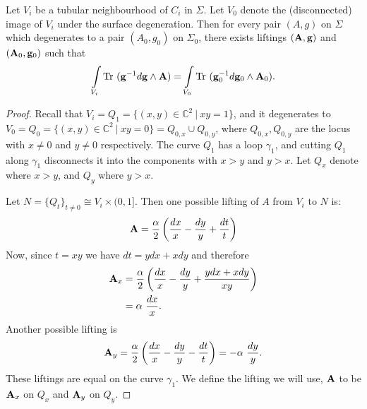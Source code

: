 	\begin{lemma}
		Let $V_i$ be a tubular neighbourhood of $C_i$ in $\Sigma$. Let $V_{0}$ denote the (disconnected) image of $V_i$ under the surface degeneration. Then for every pair $(A,g)$ on $\Sigma$ which degenerates to a pair $(A_0, g_0)$ on $\Sigma_0$, there exists liftings $(\mathbf{A},\mathbf{g})$ and $(\mathbf{A}_0,\mathbf{g}_0)$ such that
		\begin{equation}
			\int\limits_{V_i} \text{Tr }(\mathbf{g}^{-1}d\mathbf{g}\wedge \mathbf{A}) = \int\limits_{V_0} \text{Tr }(\mathbf{g}_0^{-1}d\mathbf{g}_0\wedge \mathbf{A}_0).
		\end{equation}
		\label{l:main-lemma}
	\end{lemma}
	\begin{proof}
		Recall that $V_i=Q_1 = \{(x,y)\in \mathbb{C}^2~|~ xy=1\}$, and it degenerates to $V_0 = Q_0 = \{(x,y)\in\mathbb{C}^2~|~xy=0\} = Q_{0,x} \cup Q_{0,y}$, where $Q_{0,x},Q_{0,y}$ are the locus with $x\neq0$ and $y\neq 0$ respectively. The curve $Q_1$ has a loop $\gamma_1$, and cutting $Q_1$ along $\gamma_1$ disconnects it into the components with $x>y$ and $y>x$. Let $Q_x$ denote where $x>y$, and $Q_y$ where $y>x$.
		
		Let $N=\{Q_t\}_{t\neq 0}\cong V_i\times(0,1]$. Then one possible lifting of $A$ from $V_i$ to $N$ is:
		\begin{equation}
			\mathbf{A} = \frac{\alpha}{2}\left(\frac{dx}{x}-\frac{dy}{y} + \frac{dt}{t}\right)
		\end{equation}
		Now, since $t=xy$ we have $dt =ydx+xdy$ and therefore
		\begin{align*}
			\mathbf{A}_x &= \frac{\alpha}{2}\left(\frac{dx}{x}-\frac{dy}{y} + \frac{ydx+xdy}{xy}\right)\\
			&= \alpha~ \frac{dx}{x}.
		\end{align*}
		Another possible lifting is 
		\begin{equation}
			\mathbf{A}_y = \frac{\alpha}{2}\left(\frac{dx}{x}-\frac{dy}{y} -  \frac{dt}{t}\right) = -\alpha~\frac{dy}{y}.
		\end{equation}
		These liftings are equal on the curve $\gamma_1$. We define the lifting we will use, $\mathbf{A}$ to be $\mathbf{A}_x$ on $Q_x$ and $\mathbf{A}_y$ on $Q_y$.
		

\end{proof}
